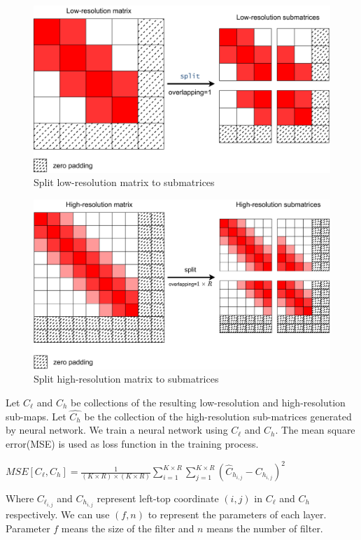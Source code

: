 \documentclass[a4paper,12pt]{article}
\begin{document}
\begin{figure}[htbp]
\centering
\includegraphics[scale=0.03]{figures/lowres_split.png}
\caption{Split low-resolution matrix to submatrices}
\label{low-res to submatrices}
\end{figure}

\begin{figure}[htbp]
\centering
\includegraphics[scale=0.03]{figures/highres_split.png}
\caption{Split high-resolution matrix to submatrices}
\end{figure}


Let $C_\ell$ and $C_h$ be collections of the resulting low-resolution and high-resolution
sub-maps. Let $\hat{C_h}$ be the collection of the high-resolution sub-matrices generated by neural network. We train a neural network using $C_\ell$ and $C_h$. The mean square error(MSE) is used as 
loss function in the training process. 



\begin{center}
    $MSE[C_\ell, C_h] = \frac{1}{(K \times R)\times (K \times R)} \sum_{i=1}^{K \times R} \sum_{j=1}^{K \times R} (\hat{C}_{h_{i,j}}-C_{h_{i,j}})^2$
\end{center}
Where $C_{\ell_{i,j}}$ and $C_{h_{i,j}}$ represent left-top coordinate $(i,j)$ in $C_\ell$ and $C_h$ respectively.
We can use $(f,n)$ to represent the parameters of each layer. Parameter $f$ means the size of the filter and $n$ means the number of filter. 
\end{document}
